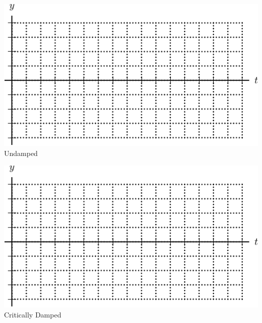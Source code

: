   \begin{minipage}[h]{0.475\linewidth}
    \begin{center}
      
   \vspace{0pt} 
   \includegraphics[width=0.9\linewidth]{graphics/notes_08_spring_mass_axes}\\
Undamped 

\hrulefill

   \includegraphics[width=0.9\linewidth]{graphics/notes_08_spring_mass_axes}\\
Critically Damped
    \end{center}
  \end{minipage}
